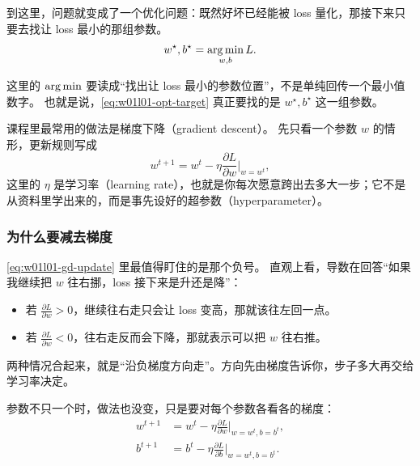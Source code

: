 \documentclass[main.tex]{subfiles}
\begin{document}
到这里，问题就变成了一个优化问题：既然好坏已经能被 loss 量化，那接下来只要去找让 loss 最小的那组参数。
\begin{equation}
  w^\star, b^\star = \operatorname*{arg\,min}_{w,b} L.
  \label{eq:w01l01-opt-target}
\end{equation}

这里的 $\operatorname*{arg\,min}$ 要读成“找出让 loss 最小的参数位置”，不是单纯回传一个最小值数字。
也就是说，\cref{eq:w01l01-opt-target} 真正要找的是 $w^\star,b^\star$ 这一组参数。

课程里最常用的做法是梯度下降（gradient descent）。
先只看一个参数 $w$ 的情形，更新规则写成
\begin{equation}
  w^{t+1} = w^t - \eta \frac{\partial L}{\partial w}\bigg\vert_{w=w^t},
  \label{eq:w01l01-gd-update}
\end{equation}
这里的 $\eta$ 是学习率（learning rate），也就是你每次愿意跨出去多大一步；它不是从资料里学出来的，而是事先设好的超参数（hyperparameter）。

\subsubsection{为什么要减去梯度}

\cref{eq:w01l01-gd-update} 里最值得盯住的是那个负号。
直观上看，导数在回答“如果我继续把 $w$ 往右挪，loss 接下来是升还是降”：
\begin{itemize}
  \item 若 $\frac{\partial L}{\partial w} > 0$，继续往右走只会让 loss 变高，那就该往左回一点。
  \item 若 $\frac{\partial L}{\partial w} < 0$，往右走反而会下降，那就表示可以把 $w$ 往右推。
\end{itemize}

两种情况合起来，就是“沿负梯度方向走”。方向先由梯度告诉你，步子多大再交给学习率决定。

\begin{algorithm}[htbp]
  \caption{单参数梯度下降}
  \label{alg:w01l01-gradient-descent}
\end{algorithm}

参数不只一个时，做法也没变，只是要对每个参数各看各的梯度：
\begin{align}
  w^{t+1} &= w^t - \eta \frac{\partial L}{\partial w}\bigg\vert_{w=w^t,b=b^t}, \label{eq:w01l01-gd-w} \\
  b^{t+1} &= b^t - \eta \frac{\partial L}{\partial b}\bigg\vert_{w=w^t,b=b^t}. \label{eq:w01l01-gd-b}
\end{align}
\end{document}
